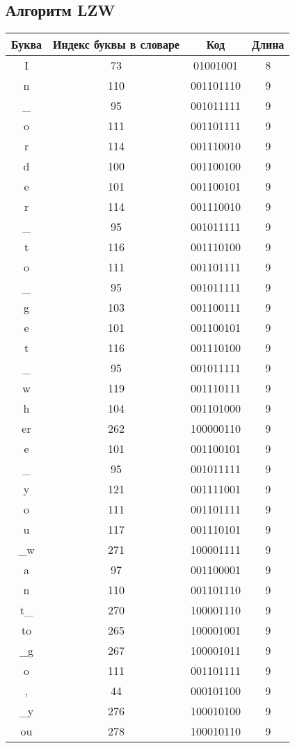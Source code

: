 \subsection{Алгоритм LZW}
\begin{center}
    \begin{longtable}{|c|c|c|c|}
    \hline
    Буква&Индекс буквы в словаре&Код&Длина\\    
 \hline I&73&01001001&8\\  \hline n&110&001101110&9\\  \hline \_&95&001011111&9\\  \hline o&111&001101111&9\\  \hline r&114&001110010&9\\  \hline d&100&001100100&9\\  \hline e&101&001100101&9\\  \hline r&114&001110010&9\\  \hline \_&95&001011111&9\\  \hline t&116&001110100&9\\  \hline o&111&001101111&9\\  \hline \_&95&001011111&9\\  \hline g&103&001100111&9\\  \hline e&101&001100101&9\\  \hline t&116&001110100&9\\  \hline \_&95&001011111&9\\  \hline w&119&001110111&9\\  \hline h&104&001101000&9\\  \hline er&262&100000110&9\\  \hline e&101&001100101&9\\  \hline \_&95&001011111&9\\  \hline y&121&001111001&9\\  \hline o&111&001101111&9\\  \hline u&117&001110101&9\\  \hline \_w&271&100001111&9\\  \hline a&97&001100001&9\\  \hline n&110&001101110&9\\  \hline t\_&270&100001110&9\\  \hline to&265&100001001&9\\  \hline \_g&267&100001011&9\\  \hline o&111&001101111&9\\  \hline ,&44&000101100&9\\  \hline \_y&276&100010100&9\\  \hline ou&278&100010110&9\\  \hline 
\end{longtable}
\end{center}
